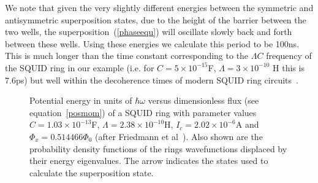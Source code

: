 \documentclass[12pt,a4paper,superscriptaddress,showpacs,floatfix,pra]{revtex4-2}
\begin{document}
We note  that given the  very slightly different energies  between the
symmetric and antisymmetric superposition states, due to the height of
the barrier between  the two wells, the superposition~(\ref{phaseequ})
will oscillate slowly back and  forth between these wells. Using these
energies we  calculate this  period to be  100ns. This is  much longer
than the time  constant corresponding to the $\Lambda  C$ frequency of
the    SQUID   ring    in   our    example   (i.e.    for   $C=5\times
10^{-15}$\textrm{F},  $\Lambda =3\times  10^{-10}$ \textrm{H}  this is
$7.6$\textrm{ps})  but well  within  the decoherence  times of  modern
SQUID ring circuits~\cite{Martinis2002,Zhou2002,Han2001,Mooij2003}.

\begin{figure}[!t]
\begin{center}
\end{center}
\caption{Potential   energy  in   units  of   $\hbar   \omega$  versus
dimensionless flux  (see equation~\ref{posmom})  of a SQUID  ring with
parameter  values  $  C=1.03\times  10^{-13}$F,  $\Lambda  =2.38\times
10^{-10}$H,  $I_{c}=2.02\times 10^{-6}$A  and  $\Phi _{x}=0.514466\Phi
_{0}$  (after  Friedmann  et  al~\protect\cite{FriedmanPCTL00}).  Also
shown are the probability density functions of the rings wavefunctions
displaced by their energy eigenvalues.  The arrow indicates the states
used to calculate the superposition state.}
\label{friedpot}
\end{figure}
\end{document}
